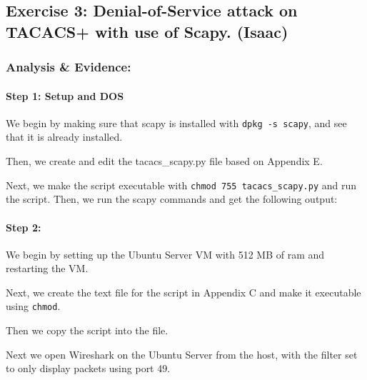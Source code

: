 \documentclass[main.tex]{subfiles}
\begin{document}
\subsection{Exercise 3: Denial-of-Service attack on TACACS+ with use of Scapy. (Isaac)}

\subsubsection{Analysis \& Evidence:}


\paragraph{Step 1: Setup and DOS}
\hfill \break

We begin by making sure that scapy is installed with \texttt{dpkg -s scapy}, and see that it is already installed.


Then, we create and edit the tacacs\_scapy.py file based on Appendix E.


Next, we make the script executable with \texttt{chmod 755 tacacs\_scapy.py} and run the script. Then, we run the scapy commands and get the following output:



\paragraph{Step 2: }
\hfill \break

We begin by setting up the Ubuntu Server VM with 512 MB of ram and restarting the VM. 


Next, we create the text file for the script in Appendix C and make it executable using \texttt{chmod}. 


Then we copy the script into the file.


Next we open Wireshark on the Ubuntu Server from the host, with the filter set to only display packets using port 49.
\end{document}
